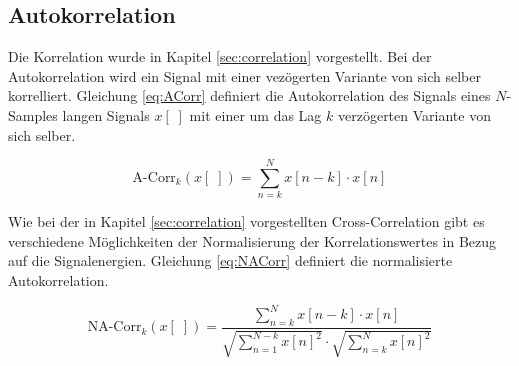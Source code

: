

 

\subsection{Autokorrelation}

Die Korrelation wurde in Kapitel \ref{sec:correlation} vorgestellt. Bei der Autokorrelation wird ein Signal mit einer vezögerten Variante von sich selber korrelliert. Gleichung \ref{eq:ACorr} definiert die Autokorrelation des Signals eines $N$-Samples langen Signals $x[\;]$ mit einer um das Lag $k$ verzögerten Variante von sich selber.

\begin{equation}
\text{A-Corr}_k(x[\;]) = \sum_{n=k}^{N} x[n-k] \cdot x[n]
\label{eq:ACorr}
\end{equation}

Wie bei der in Kapitel \ref{sec:correlation} vorgestellten Cross-Correlation gibt es verschiedene Möglichkeiten der Normalisierung der Korrelationswertes in Bezug auf die Signalenergien. Gleichung \ref{eq:NACorr} definiert die normalisierte Autokorrelation.\cite{vad_Lisboa}

\begin{equation}
\text{NA-Corr}_k(x[\;]) = \frac{\sum_{n=k}^{N} x[n-k] \cdot x[n]}{ \sqrt{\sum_{n=1}^{N-k}  x[n]^2}  \cdot  \sqrt{\sum_{n=k}^{N}  x[n]^2} }
\label{eq:NACorr}
\end{equation}


